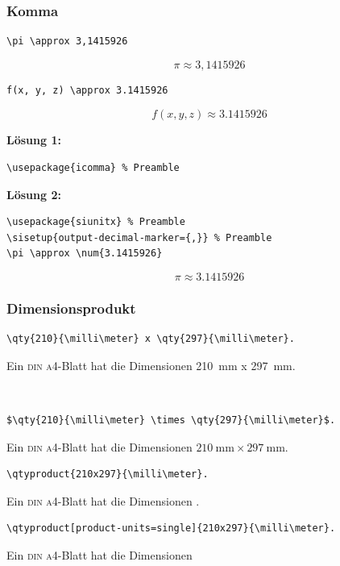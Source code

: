 \documentclass[aspectratio=169, 10pt]{beamer}
\begin{document}
\begin{frame}[fragile]
    \frametitle{Komma}
    \begin{wrong}
        \begin{lstlisting}
\pi \approx 3,1415926
        \end{lstlisting}
        \begin{equation*}
            \pi \approx 3,1415926
        \end{equation*}
    \end{wrong}
    \pause
    \begin{lstlisting}
f(x, y, z) \approx 3.1415926
    \end{lstlisting}
    \begin{equation*}
        f(x,y,z) \approx 3.1415926
    \end{equation*}

    \pause

    \textbf{Lösung 1:}
    \begin{lstlisting}
\usepackage{icomma} % Preamble
    \end{lstlisting}

    \pause

    \textbf{Lösung 2:}
    \begin{lstlisting}
\usepackage{siunitx} % Preamble
\sisetup{output-decimal-marker={,}} % Preamble
\pi \approx \num{3.1415926}
    \end{lstlisting}
    \begin{equation*}
        \pi \approx \num[output-decimal-marker={,}]{3.1415926}
    \end{equation*}
\end{frame}

\begin{frame}[fragile]
    \frametitle{Dimensionsprodukt}
    \begin{wrong}
        \begin{lstlisting}
\qty{210}{\milli\meter} x \qty{297}{\milli\meter}.
        \end{lstlisting}
        Ein \textsc{din a4}-Blatt hat die Dimensionen \qty{210}{\milli\meter} x \qty{297}{\milli\meter}.
    \end{wrong}\\[2ex]
    \pause

    \begin{lstlisting}
$\qty{210}{\milli\meter} \times \qty{297}{\milli\meter}$.
    \end{lstlisting}
    Ein \textsc{din a4}-Blatt hat die Dimensionen $\qty{210}{\milli\meter} \times \qty{297}{\milli\meter}$.\\[2ex]
    \pause

    \begin{lstlisting}
\qtyproduct{210x297}{\milli\meter}.
    \end{lstlisting}
    Ein \textsc{din a4}-Blatt hat die Dimensionen .

    \begin{lstlisting}
\qtyproduct[product-units=single]{210x297}{\milli\meter}.
    \end{lstlisting}
    Ein \textsc{din a4}-Blatt hat die Dimensionen 
\end{frame}
\end{document}
